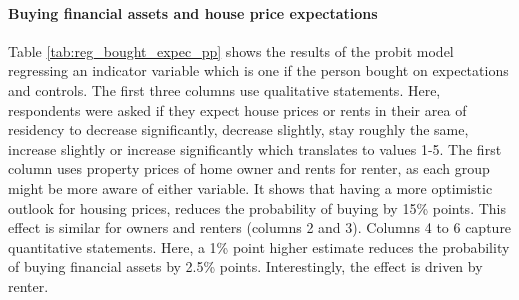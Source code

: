 \documentclass[ProjectABM]{subfiles}
\begin{document}
%



\paragraph{Buying financial assets and house price expectations}
Table \ref{tab:reg_bought_expec_pp} shows the results of the probit model regressing an indicator variable which is one if the person bought on expectations and controls. The first three columns use qualitative statements. Here, respondents were asked if they expect house prices or rents in their area of residency to decrease significantly, decrease slightly, stay roughly the same, increase slightly or increase significantly which translates to values 1-5. The first column uses property prices of home owner and rents for renter, as each group might be more aware of either variable. It shows that having a more optimistic outlook for housing prices, reduces the probability of buying by 15\% points. This effect is similar for owners and renters (columns 2 and 3). %
Columns 4 to 6 capture quantitative statements. Here, a 1\% point higher estimate reduces the probability of buying financial assets by 2.5\% points. Interestingly, the effect is driven by renter.





\end{document}
